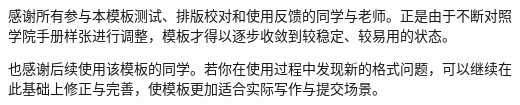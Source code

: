 
\gdtbodytext

感谢所有参与本模板测试、排版校对和使用反馈的同学与老师。正是由于不断对照学院手册样张进行调整，模板才得以逐步收敛到较稳定、较易用的状态。

也感谢后续使用该模板的同学。若你在使用过程中发现新的格式问题，可以继续在此基础上修正与完善，使模板更加适合实际写作与提交场景。
